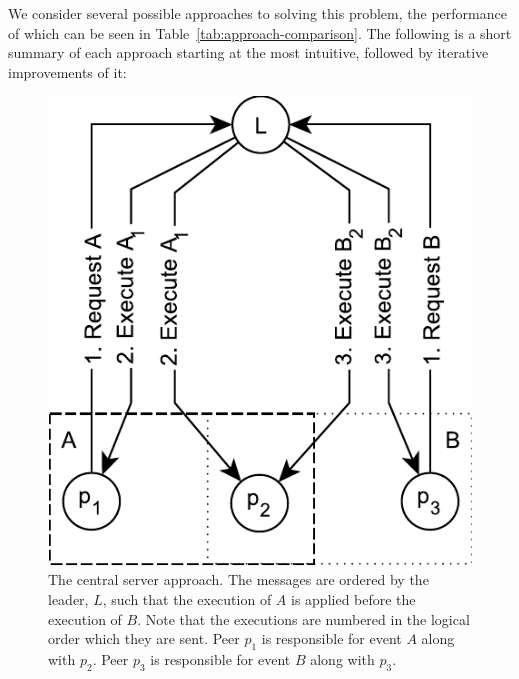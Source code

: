 \documentclass{article}
\begin{document}
	We consider several possible approaches to solving this problem, the performance of which can be seen in Table~\ref{tab:approach-comparison}.
	The following is a short summary of each approach starting at the most intuitive, followed by iterative improvements of it:

    \begin{figure}[ht]
        \center
        \includegraphics[scale=0.7]{figures/dcr-graphs/central-server-approach}
        \caption{The central server approach.
        The messages are ordered by the leader, $L$, such that the execution of $A$ is applied before the execution of $B$.
        Note that the executions are numbered in the logical order which they are sent.
        Peer $p_1$ is responsible for event $A$ along with $p_2$.
        Peer $p_3$ is responsible for event $B$ along with $p_3$.}
        \label{fig:central-server-approach}
    \end{figure}
    \FloatBarrier
\end{document}
